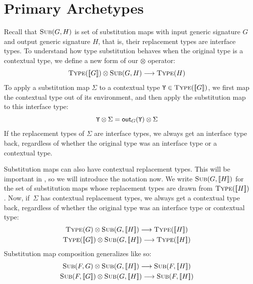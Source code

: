 \documentclass[../generics]{subfiles}
\begin{document}
\section{Primary Archetypes}\label{archetypesubst}

Recall that $\textsc{Sub}({G, H})$ is set of substitution maps with input generic signature $G$ and output generic signature $H$, that is, their replacement types are interface types. To understand how type substitution behaves when the original type is a contextual type, we define a new form of our $\otimes$ operator:
\[
\textsc{Type}({[\![G]\!]})\otimes\textsc{Sub}({G, H})\longrightarrow\textsc{Type}({H})
\]
To apply a substitution map $\Sigma$ to a contextual type $\texttt{Y}\in\textsc{Type}({[\![G]\!]})$, we first map the contextual type out of its environment, and then apply the substitution map to this interface type:
\[\texttt{Y}\otimes \Sigma = \mathsf{out}_G(\texttt{Y})\otimes \Sigma\]
If the replacement types of $\Sigma$ are interface types, we always get an interface type back, regardless of whether the original type was an interface type or a contextual type.

Substitution maps can also have contextual replacement types. This will be important in , so we will introduce the notation now. We write $\textsc{Sub}({G, [\![H]\!]})$ for the set of substitution maps whose replacement types are drawn from $\textsc{Type}({[\![H]\!]})$. Now, if~$\Sigma$ has contextual replacement types, we always get a contextual type back, regardless of whether the original type was an interface type or contextual type:
\begin{gather*}
\TypeObj{G}\otimes\SubMapObjCtx{G}{H}\longrightarrow\TypeObjCtx{H}\\
\TypeObjCtx{G}\otimes\SubMapObjCtx{G}{H}\longrightarrow\TypeObjCtx{H}
\end{gather*}
Substitution map composition generalizes like so:
\begin{gather*}
\SubMapObj{F}{G}\otimes\SubMapObjCtx{G}{H}\longrightarrow\SubMapObjCtx{F}{H}\\
\SubMapObjCtx{F}{G}\otimes\SubMapObjCtx{G}{H}\longrightarrow\SubMapObjCtx{F}{H}
\end{gather*}
\end{document}
